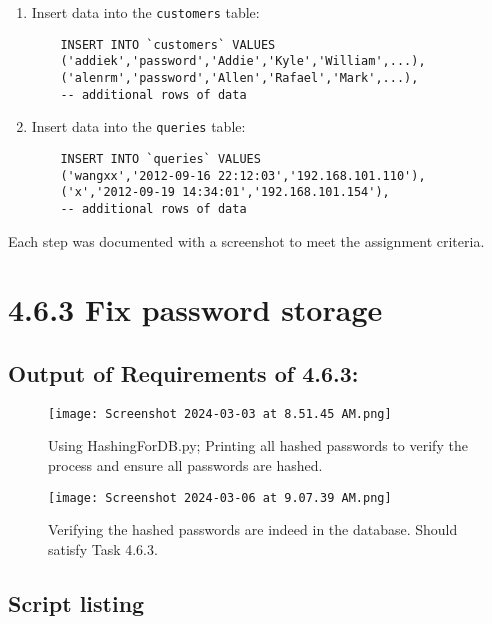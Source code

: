 \documentclass{article}
\begin{document}
\begin{enumerate}
    \item Insert data into the \texttt{customers} table:
    \begin{verbatim}
    INSERT INTO `customers` VALUES
    ('addiek','password','Addie','Kyle','William',...),
    ('alenrm','password','Allen','Rafael','Mark',...),
    -- additional rows of data
    \end{verbatim}

    \item Insert data into the \texttt{queries} table:
    \begin{verbatim}
    INSERT INTO `queries` VALUES
    ('wangxx','2012-09-16 22:12:03','192.168.101.110'),
    ('x','2012-09-19 14:34:01','192.168.101.154'),
    -- additional rows of data
    \end{verbatim}
\end{enumerate}

Each step was documented with a screenshot to meet the assignment criteria.

\section*{4.6.3 Fix password storage}

\subsection*{Output of Requirements of 4.6.3:}
\begin{figure}[H]
    \centering
    \texttt{[image: Screenshot 2024-03-03 at 8.51.45 AM.png]}
    \caption{Using HashingForDB.py; Printing all hashed passwords to verify the process and ensure all passwords are hashed.}
\end{figure}

\begin{figure}[H]
    \centering
    \texttt{[image: Screenshot 2024-03-06 at 9.07.39 AM.png]}
    \caption{Verifying the hashed passwords are indeed in the database. Should satisfy Task 4.6.3.}
\end{figure}

\subsection*{Script listing}

\end{document}
